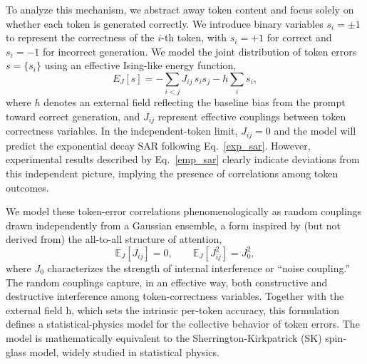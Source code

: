 \documentclass{article}
\theoremstyle{plain}
\begin{document}
To analyze this mechanism, we abstract away token content and focus solely on whether each token is generated correctly. We introduce binary variables $s_i = \pm 1$ to represent the correctness of the $i$-th token, with $s_i = +1$ for correct and $s_i = -1$ for incorrect generation. We model the joint distribution of token errors $s = \{s_i\}$ using an effective Ising-like energy function,
\begin{equation}
E_J[s] = -\sum_{i<j} J_{ij}\, s_i s_j - h \sum_i s_i,
\end{equation}
where $h$ denotes an external field reflecting the baseline bias from the prompt toward correct generation, and $J_{ij}$ represent effective couplings between token correctness variables. In the independent-token limit, $J_{ij}=0$ and the model will predict the exponential decay SAR following Eq.~\eqref{exp_sar}. However, experimental results described by Eq.~\eqref{emp_sar} clearly indicate deviations from this independent picture, implying the presence of correlations among token outcomes.

We model these token-error correlations phenomenologically as random couplings drawn independently from a Gaussian ensemble, a form inspired by (but not derived from) the all-to-all structure of attention,
\begin{equation}
    \mathbb{E}_J[J_{ij}] = 0, \qquad
    \mathbb{E}_J[J_{ij}^2] = J_0^2,
\end{equation}
where $J_0$ characterizes the strength of internal interference or “noise coupling.” The random couplings capture, in an effective way, both constructive and destructive interference among token-correctness variables. Together with the external field h, which sets the intrinsic per-token accuracy, this formulation defines a statistical-physics model for the collective behavior of token errors. The model is mathematically equivalent to the Sherrington-Kirkpatrick (SK) spin-glass model, widely studied in statistical physics.
\end{document}

